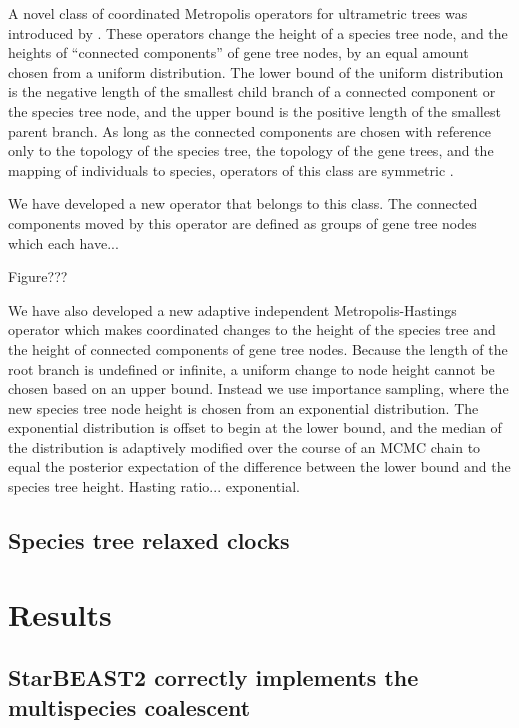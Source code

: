 \documentclass[12pt]{article}
\begin{document}
A novel class of coordinated Metropolis operators for ultrametric trees was
introduced by \cite{Jones010199}. These operators change the height of a species
tree node, and the heights of ``connected components'' of gene tree nodes, by an
equal amount chosen from a uniform distribution. The lower bound of the uniform
distribution is the negative length of the smallest child branch of a connected
component or the species tree node, and the upper bound is the positive length
of the smallest parent branch. As long as the connected components are chosen
with reference only to the topology of the species tree, the topology of the
gene trees, and the mapping of individuals to species, operators of this class
are symmetric \citep{Jones010199}.

We have developed a new operator that belongs to this class. The connected
components moved by this operator are defined as groups of gene tree nodes which
each have...

Figure???

We have also developed a new adaptive independent Metropolis-Hastings
\citep{Andrieu2008} operator which makes coordinated changes to the height of
the species tree and the height of connected components of gene tree nodes.
Because the length of the root branch is undefined or infinite, a uniform change
to node height cannot be chosen based on an upper bound. Instead we use
importance sampling, where the new species tree node height is chosen from an
exponential distribution. The exponential distribution is offset to begin at the
lower bound, and the median of the distribution is adaptively modified over the
course of an MCMC chain to equal the posterior expectation of the difference
between the lower bound and the species tree height. Hasting ratio...
exponential.

\subsection{Species tree relaxed clocks}

\section{Results}

\subsection{StarBEAST2 correctly implements the multispecies coalescent}
\end{document}
